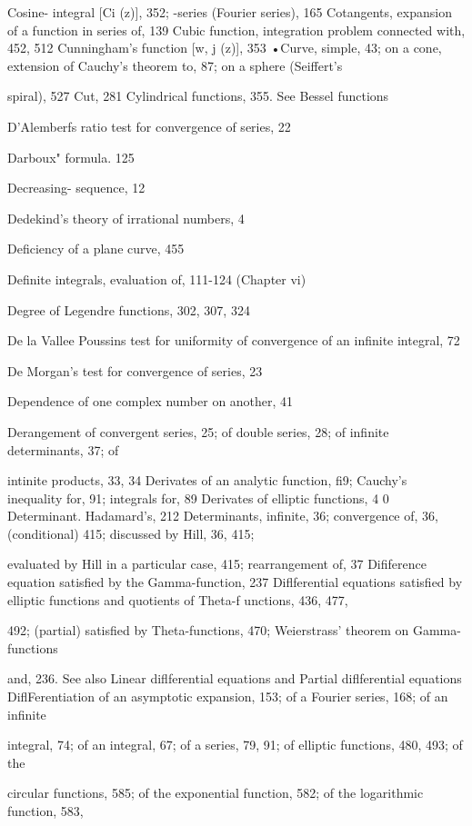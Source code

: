 Cosine- integral [Ci (z)], 352; -series (Fourier series), 165
Cotangents, expansion of a function in series of, 139
Cubic function, integration problem connected with, 452, 512
Cunningham's function [w,  j (z)], 353
•Curve, simple, 43; on a cone, extension of Cauchy's theorem to, 87; on a sphere (Seiffert's

spiral), 527
Cut, 281
Cylindrical functions, 355. See Bessel functions

%
%
D'Alemberfs ratio test for convergence of series, 22

Darboux" formula. 125

Decreasing- sequence, 12

Dedekind's theory of irrational numbers, 4

Deficiency of a plane curve, 455

Definite integrals, evaluation of, 111-124 (Chapter vi)

Degree of Legendre functions, 302, 307, 324

De la Vallee Poussins test for uniformity of convergence of an infinite integral, 72

De Morgan's test for convergence of series, 23

Dependence of one complex number on another, 41

Derangement of convergent series, 25; of double series, 28; of infinite determinants, 37; of

intinite products, 33, 34
Derivates of an analytic function, fi9; Cauchy's inequality for, 91; integrals for, 89
Derivates of elliptic functions, 4 0
Determinant. Hadamard's, 212
Determinants, infinite, 36; convergence of, 36, (conditional) 415; discussed by Hill, 36, 415;

evaluated by Hill in a particular case, 415; rearrangement of, 37
Difiference equation satisfied by the Gamma-function, 237
Diflferential equations satisfied by elliptic functions and quotients of Theta-f unctions, 436, 477,

492; (partial) satisfied by Theta-functions, 470; Weierstrass' theorem on Gamma-functions

and, 236. See also Linear diflferential equations and Partial diflferential equations
DiflFerentiation of an asymptotic expansion, 153; of a Fourier series, 168; of an infinite

integral, 74; of an integral, 67; of a series, 79, 91; of elliptic functions, 480, 493; of the

circular functions, 585; of the exponential function, 582; of the logarithmic function, 583,


